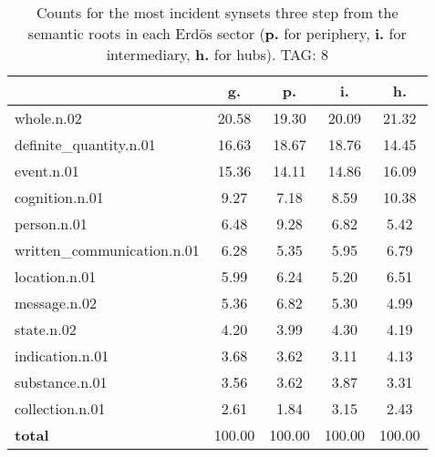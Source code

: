 \begin{table}[h!]
\begin{center}
\begin{tabular}{| l | c | c | c | c |}\hline
 & g. & p. & i. & h. \\\hline
whole.n.02 & 20.58  & 19.30  & 20.09  & 21.32 \\\hline
definite\_quantity.n.01 & 16.63  & 18.67  & 18.76  & 14.45 \\\hline
event.n.01 & 15.36  & 14.11  & 14.86  & 16.09 \\\hline
cognition.n.01 & 9.27  & 7.18  & 8.59  & 10.38 \\\hline
person.n.01 & 6.48  & 9.28  & 6.82  & 5.42 \\\hline
written\_communication.n.01 & 6.28  & 5.35  & 5.95  & 6.79 \\\hline
location.n.01 & 5.99  & 6.24  & 5.20  & 6.51 \\\hline
message.n.02 & 5.36  & 6.82  & 5.30  & 4.99 \\\hline
state.n.02 & 4.20  & 3.99  & 4.30  & 4.19 \\\hline
indication.n.01 & 3.68  & 3.62  & 3.11  & 4.13 \\\hline
substance.n.01 & 3.56  & 3.62  & 3.87  & 3.31 \\\hline
collection.n.01 & 2.61  & 1.84  & 3.15  & 2.43 \\\hline
{{\bf total}} & 100.00  & 100.00  & 100.00  & 100.00 \\\hline
\end{tabular}
\caption{Counts for the most incident synsets three step from the semantic roots in each Erd\"os sector ({\bf p.} for periphery, {\bf i.} for intermediary, {\bf h.} for hubs). TAG: 8}
\end{center}
\end{table}